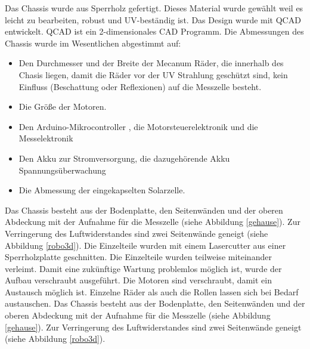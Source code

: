 \documentclass[a4paper,bibtotoc,oneside]{scrbook}
\begin{document}
\noindent Das Chassis wurde aus Sperrholz gefertigt. Dieses Material wurde gewählt weil es leicht zu bearbeiten, robust und UV-beständig ist. Das Design wurde mit QCAD entwickelt. QCAD ist ein 2-dimensionales CAD Programm. 
Die Abmessungen des Chassis wurde im Wesentlichen abgestimmt auf: \begin{itemize}
\item Den Durchmesser und der Breite der Mecanum Räder, die innerhalb des Chasis liegen, damit die Räder vor der UV Strahlung geschützt sind, kein Einfluss (Beschattung oder Reflexionen) auf die Messzelle besteht.
\item Die Größe der Motoren.
\item Den Arduino-Mikrocontroller , die Motorsteuerelektronik und die Messelektronik
\item Den Akku zur Stromversorgung, die dazugehörende Akku Spannungsüberwachung 
\item Die Abmessung der eingekapselten Solarzelle.
 \end{itemize}

Das Chassis besteht aus der Bodenplatte, den Seitenwänden und der oberen Abdeckung mit der Aufnahme für die Messzelle (siehe Abbildung \ref{gehause}). Zur Verringerung des Luftwiderstandes sind zwei Seitenwände geneigt (siehe Abbildung \ref{robo3d}).  
\noindent Die Einzelteile wurden mit einem Lasercutter aus einer Sperrholzplatte geschnitten. Die Einzelteile wurden teilweise miteinander verleimt. Damit eine zukünftige Wartung problemlos möglich ist, wurde der Aufbau verschraubt ausgeführt.
Die Motoren sind verschraubt, damit ein Austausch möglich ist. Einzelne Räder als auch die Rollen lassen sich bei Bedarf austauschen. 
Das Chassis besteht aus der Bodenplatte, den Seitenwänden und der oberen Abdeckung mit der Aufnahme für die Messzelle (siehe Abbildung \ref{gehause}). Zur Verringerung des Luftwiderstandes sind zwei Seitenwände geneigt (siehe Abbildung \ref{robo3d}).  
\end{document}
